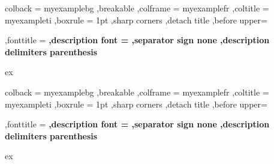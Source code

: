 {%
    colback = myexamplebg
    ,breakable
    ,colframe = myexamplefr
    ,coltitle = myexampleti
    ,boxrule = 1pt
    ,sharp corners
    ,detach title
    ,before upper=\tcbtitle\par\smallskip
    ,fonttitle = \bfseries
    ,description font = \mdseries
    ,separator sign none
    ,description delimiters parenthesis
}
{ex}

{%
    colback = myexamplebg
    ,breakable
    ,colframe = myexamplefr
    ,coltitle = myexampleti
    ,boxrule = 1pt
    ,sharp corners
    ,detach title
    ,before upper=\tcbtitle\par\smallskip
    ,fonttitle = \bfseries
    ,description font = \mdseries
    ,separator sign none
    ,description delimiters parenthesis
}
{ex}


